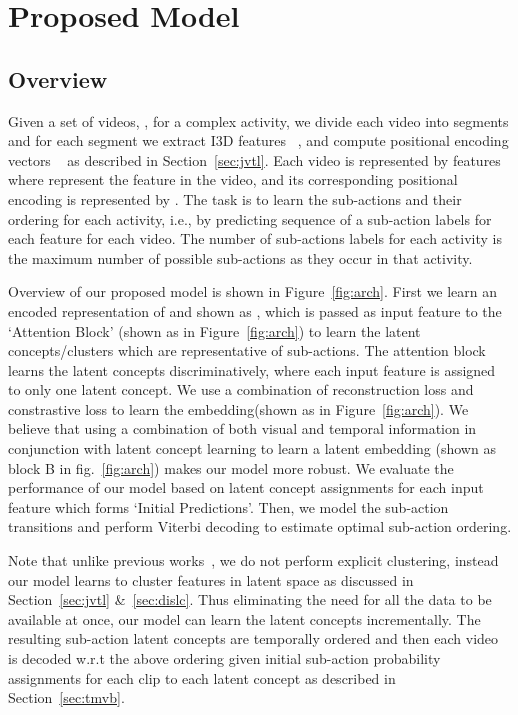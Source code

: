 \documentclass[final]{cvpr}
\begin{document}
\section{Proposed Model}
\subsection{Overview}
\label{sec:overview}
\par Given a set of  videos, , for a complex activity, we divide each video into segments and for each segment we extract I3D features~\cite{rl-a-carreira2017quo} , and compute positional encoding vectors ~\cite{vaswani2017attention} as described in Section~\ref{sec:jvtl}. Each video 
is represented by  features where  represent the  feature in the  video, and its corresponding positional encoding is represented by . The task is to learn the sub-actions and their ordering for each activity, i.e., by predicting sequence of a sub-action labels  for each feature  for each video. The number of sub-actions labels  for each activity is the maximum number of possible sub-actions as they occur in that activity. 


\par Overview of our proposed model is shown in Figure~\ref{fig:arch}. First we learn an encoded representation of  and  shown as ,
which is passed as input feature to the `Attention Block' (shown as  in Figure~\ref{fig:arch}) to learn the latent concepts/clusters which are representative of sub-actions.
The attention block learns the latent concepts  discriminatively, where each input feature  is assigned to only one latent concept.
We use a combination of reconstruction loss and constrastive loss to learn the embedding(shown as  in Figure~\ref{fig:arch}). 
We believe that using a combination of both visual and temporal information in conjunction with latent concept learning to learn a latent embedding (shown as block B in fig.~\ref{fig:arch}) makes our model more robust.
We evaluate the performance of our model based on latent concept assignments for each input feature which forms `Initial Predictions'. 
Then, we model the sub-action transitions and perform Viterbi decoding to estimate optimal sub-action ordering.

\par Note that unlike previous works~\cite{kukleva2019unsupervised}, we do not perform explicit clustering, instead our model learns to cluster features in latent space as discussed in Section~\ref{sec:jvtl} \&~\ref{sec:dislc}. 
Thus eliminating the need for all the data to be available at once, our model can learn the latent concepts incrementally. The resulting sub-action latent concepts are temporally ordered and then each video is decoded w.r.t the above ordering given initial sub-action probability assignments for each clip to each latent concept as described in Section~\ref{sec:tmvb}.
\end{document}
